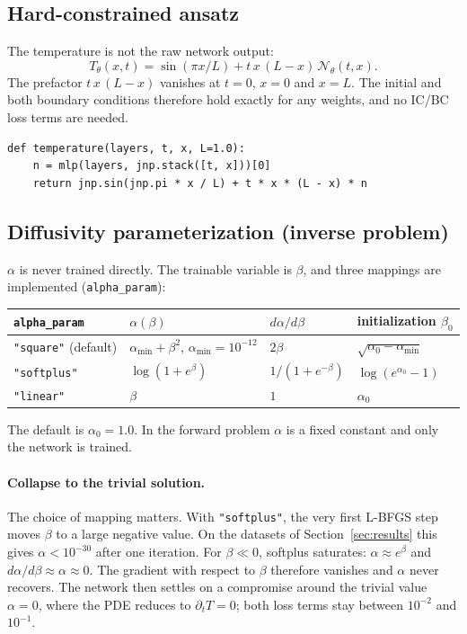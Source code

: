 \documentclass[10pt]{article}
\newcommand{\code}[1]{\texttt{#1}}
\begin{document}
\subsection{Hard-constrained ansatz}
The temperature is not the raw network output:
\begin{equation}
T_\theta(x,t)=\sin(\pi x/L)+t\,x\,(L-x)\,\mathcal{N}_\theta(t,x).
\end{equation}
The prefactor $t\,x\,(L-x)$ vanishes at $t=0$, $x=0$ and $x=L$. The initial and both boundary conditions therefore hold exactly for any weights, and no IC/BC loss terms are needed.
\begin{lstlisting}
def temperature(layers, t, x, L=1.0):
    n = mlp(layers, jnp.stack([t, x]))[0]
    return jnp.sin(jnp.pi * x / L) + t * x * (L - x) * n
\end{lstlisting}

\subsection{Diffusivity parameterization (inverse problem)}
$\alpha$ is never trained directly. The trainable variable is $\beta$, and three mappings are implemented (\code{alpha\_param}):
\begin{center}
\begin{tabular}{llll}
\toprule
\code{alpha\_param} & $\alpha(\beta)$ & $d\alpha/d\beta$ & initialization $\beta_0$\\
\midrule
\code{"square"} (default) & $\alpha_{\min}+\beta^2$, $\alpha_{\min}=10^{-12}$ & $2\beta$ & $\sqrt{\alpha_0-\alpha_{\min}}$\\
\code{"softplus"} & $\log(1+e^{\beta})$ & $1/(1+e^{-\beta})$ & $\log(e^{\alpha_0}-1)$\\
\code{"linear"} & $\beta$ & $1$ & $\alpha_0$\\
\bottomrule
\end{tabular}
\end{center}
The default is $\alpha_0=1.0$. In the forward problem $\alpha$ is a fixed constant and only the network is trained.

\paragraph{Collapse to the trivial solution.} The choice of mapping matters. With \code{"softplus"}, the very first L-BFGS step moves $\beta$ to a large negative value. On the datasets of Section~\ref{sec:results} this gives $\alpha<10^{-30}$ after one iteration. For $\beta\ll0$, softplus saturates: $\alpha\approx e^{\beta}$ and $d\alpha/d\beta\approx\alpha\approx0$. The gradient with respect to $\beta$ therefore vanishes and $\alpha$ never recovers. The network then settles on a compromise around the trivial value $\alpha=0$, where the PDE reduces to $\partial_t T=0$; both loss terms stay between $10^{-2}$ and $10^{-1}$.
\end{document}
